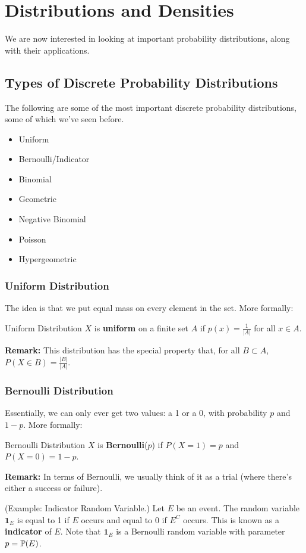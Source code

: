 \documentclass[letterpaper]{article}
\begin{document}
\section{Distributions and Densities}
We are now interested in looking at important probability distributions, along with their applications. 

\subsection{Types of Discrete Probability Distributions}
The following are some of the most important discrete probability distributions, some of which we've seen before. 
\begin{itemize}
    \item Uniform 
    \item Bernoulli/Indicator
    \item Binomial 
    \item Geometric
    \item Negative Binomial 
    \item Poisson 
    \item Hypergeometric
\end{itemize}

\subsubsection{Uniform Distribution}
The idea is that we put equal mass on every element in the set. More formally: 
\begin{definition}{Uniform Distribution}{}
    $X$ is \textbf{uniform} on a finite set $A$ if $p(x) = \frac{1}{|A|}$ for all $x \in A$. 
\end{definition}
\textbf{Remark:} This distribution has the special property that, for all $B \subset A$, $P(X \in B) = \frac{|B|}{|A|}$. 

\subsubsection{Bernoulli Distribution}
Essentially, we can only ever get two values: a 1 or a 0, with probability $p$ and $1 - p$. More formally: 
\begin{definition}{Bernoulli Distribution}{}
    $X$ is \textbf{Bernoulli}($p$) if $P(X = 1) = p$ and $P(X = 0) = 1 - p$. 
\end{definition}
\textbf{Remark:} In terms of Bernoulli, we usually think of it as a trial (where there's either a success or failure). 
\begin{mdframed}[]
    (Example: Indicator Random Variable.) Let $E$ be an event. The random variable $\mathbf{1}_E$ is equal to 1 if $E$ occurs and equal to 0 if $E^C$ occurs. This is known as a \textbf{indicator} of $E$. Note that $\mathbf{1}_E$ is a Bernoulli random variable with parameter $p = \mathbb{P}(E)$.
\end{mdframed}
\end{document}
